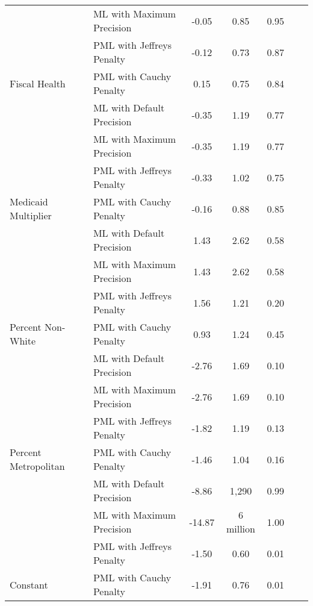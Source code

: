 \begin{tabular}{llccccc}
 & ML with Maximum Precision & -0.05 & 0.85 & 0.95 &  & \\

 & PML with Jeffreys Penalty & -0.12 & 0.73 & 0.87 &  & \\

\multirow{-4}{*}{\raggedright\arraybackslash Fiscal Health} & PML with Cauchy Penalty & 0.15 & 0.75 & 0.84 &  & \\
\cmidrule{1-7}
 & ML with Default Precision & -0.35 & 1.19 & 0.77 &  & \\

 & ML with Maximum Precision & -0.35 & 1.19 & 0.77 &  & \\

 & PML with Jeffreys Penalty & -0.33 & 1.02 & 0.75 &  & \\

\multirow{-4}{*}{\raggedright\arraybackslash Medicaid Multiplier} & PML with Cauchy Penalty & -0.16 & 0.88 & 0.85 &  & \\
\cmidrule{1-7}
 & ML with Default Precision & 1.43 & 2.62 & 0.58 &  & \\

 & ML with Maximum Precision & 1.43 & 2.62 & 0.58 &  & \\

 & PML with Jeffreys Penalty & 1.56 & 1.21 & 0.20 &  & \\

\multirow{-4}{*}{\raggedright\arraybackslash Percent Non-White} & PML with Cauchy Penalty & 0.93 & 1.24 & 0.45 &  & \\
\cmidrule{1-7}
 & ML with Default Precision & -2.76 & 1.69 & 0.10 &  & \\

 & ML with Maximum Precision & -2.76 & 1.69 & 0.10 &  & \\

 & PML with Jeffreys Penalty & -1.82 & 1.19 & 0.13 &  & \\

\multirow{-4}{*}{\raggedright\arraybackslash Percent Metropolitan} & PML with Cauchy Penalty & -1.46 & 1.04 & 0.16 &  & \\
\cmidrule{1-7}
 & ML with Default Precision & -8.86 & 1,290 & 0.99 &  & \\

 & ML with Maximum Precision & -14.87 & 6 million & 1.00 &  & \\

 & PML with Jeffreys Penalty & -1.50 & 0.60 & 0.01 &  & \\

\multirow{-4}{*}{\raggedright\arraybackslash Constant} & PML with Cauchy Penalty & -1.91 & 0.76 & 0.01 &  & \\
\bottomrule
\end{tabular}